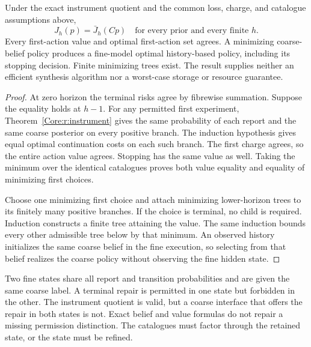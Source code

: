 \begin{Coretheorem}\label{Core:r:belief-planning}
Under the exact instrument quotient and the common loss, charge, and catalogue assumptions above,
\[
 J_h(p)=\bar J_h(Cp)\quad\text{for every prior and every finite }h.
\]
Every first-action value and optimal first-action set agrees. A minimizing coarse-belief policy produces a fine-model optimal history-based policy, including its stopping decision. Finite minimizing trees exist. The result supplies neither an efficient synthesis algorithm nor a worst-case storage or resource guarantee.
\end{Coretheorem}
\begin{proof}
At zero horizon the terminal risks agree by fibrewise summation. Suppose the equality holds at $h-1$. For any permitted first experiment, Theorem~\ref{Core:r:instrument} gives the same probability of each report and the same coarse posterior on every positive branch. The induction hypothesis gives equal optimal continuation costs on each such branch. The first charge agrees, so the entire action value agrees. Stopping has the same value as well. Taking the minimum over the identical catalogues proves both value equality and equality of minimizing first choices.

Choose one minimizing first choice and attach minimizing lower-horizon trees to its finitely many positive branches. If the choice is terminal, no child is required. Induction constructs a finite tree attaining the value. The same induction bounds every other admissible tree below by that minimum. An observed history initializes the same coarse belief in the fine execution, so selecting from that belief realizes the coarse policy without observing the fine hidden state.
\end{proof}

\begin{Corecounterexample}\label{Core:ce:permission-loss}
Two fine states share all report and transition probabilities and are given the same coarse label. A terminal repair is permitted in one state but forbidden in the other. The instrument quotient is valid, but a coarse interface that offers the repair in both states is not. Exact belief and value formulas do not repair a missing permission distinction. The catalogues must factor through the retained state, or the state must be refined.
\end{Corecounterexample}

